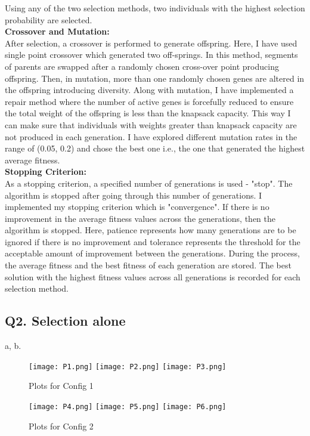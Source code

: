 \documentclass{article}
\begin{document}
Using any of the two selection methods, two individuals with the highest selection probability are selected.\\
\textbf{Crossover and Mutation:}\\
After selection, a crossover is performed to generate offspring. Here, I have used single point crossover which generated two off-springs. In this method, segments of parents are swapped after a randomly chosen cross-over point producing offspring. Then, in mutation, more than one randomly chosen genes are altered in the offspring introducing diversity. Along with mutation, I have implemented a repair method where the number of active genes is forcefully reduced to ensure the total weight of the offspring is less than the knapsack capacity. This way I can make sure that individuals with weights greater than knapsack capacity are not produced in each generation. I have explored different mutation rates in the range of (0.05, 0.2) and chose the best one i.e., the one that generated the highest average fitness.\\
\textbf{Stopping Criterion:}\\
As a stopping criterion, a specified number of generations is used - "stop". The algorithm is stopped after going through this number of generations. I implemented my stopping criterion which is "convergence". If there is no improvement in the average fitness values across the generations, then the algorithm is stopped. Here, patience represents how many generations are to be ignored if there is no improvement and tolerance represents the threshold for the acceptable amount of improvement between the generations. During the process, the average fitness and the best fitness of each generation are stored. The best solution with the highest fitness values across all generations is recorded for each selection method.\\

\subsection*{\textbf{Q2. Selection alone}}
a, b. \\
\begin{figure}[h]
\centering
{
\texttt{[image: P1.png]}
}
{
\texttt{[image: P2.png]}
}
{
\texttt{[image: P3.png]}
}
\caption{Plots for Config 1}
\label{}
\end{figure}

\begin{figure}[h]
\centering
{
\texttt{[image: P4.png]}
}
{
\texttt{[image: P5.png]}
}
{
\texttt{[image: P6.png]}
}
\caption{Plots for Config 2}
\label{}
\end{figure}
\end{document}
